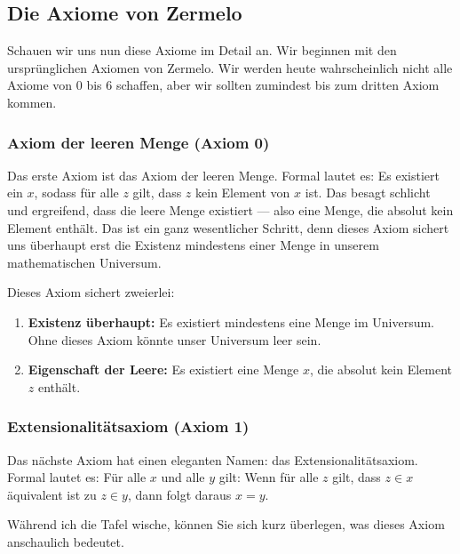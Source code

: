 \subsection{Die Axiome von Zermelo}

\begin{spoken-clean}[01:18:40 - 01:20:18]
Schauen wir uns nun diese Axiome im Detail an. Wir beginnen mit den ursprünglichen Axiomen von Zermelo. Wir werden heute wahrscheinlich nicht alle Axiome von 0 bis 6 schaffen, aber wir sollten zumindest bis zum dritten Axiom kommen.
\end{spoken-clean}

\subsubsection{Axiom der leeren Menge (Axiom 0)}
\begin{spoken-clean}[continued]
Das erste Axiom ist das Axiom der leeren Menge. Formal lautet es: Es existiert ein $x$, sodass für alle $z$ gilt, dass $z$ kein Element von $x$ ist. Das besagt schlicht und ergreifend, dass die leere Menge existiert --- also eine Menge, die absolut kein Element enthält. Das ist ein ganz wesentlicher Schritt, denn dieses Axiom sichert uns überhaupt erst die Existenz mindestens einer Menge in unserem mathematischen Universum.
\end{spoken-clean}

\begin{math-stroke}

\begin{explanation-of-steps}
Dieses Axiom sichert zweierlei:
\begin{enumerate}[label=\textbf{(\arabic*)}]
    \item \textbf{Existenz überhaupt:} Es existiert mindestens eine Menge im Universum. Ohne dieses Axiom könnte unser Universum leer sein.
    \item \textbf{Eigenschaft der Leere:} Es existiert eine Menge $x$, die absolut kein Element $z$ enthält.
\end{enumerate}
\end{explanation-of-steps}
\end{math-stroke}

\subsubsection{Extensionalitätsaxiom (Axiom 1)}
\begin{spoken-clean}[01:20:18 - 01:22:20]
Das nächste Axiom hat einen eleganten Namen: das Extensionalitätsaxiom. Formal lautet es: Für alle $x$ und alle $y$ gilt: Wenn für alle $z$ gilt, dass $z \in x$ äquivalent ist zu $z \in y$, dann folgt daraus $x = y$.

Während ich die Tafel wische, können Sie sich kurz überlegen, was dieses Axiom anschaulich bedeutet.
\end{spoken-clean}

